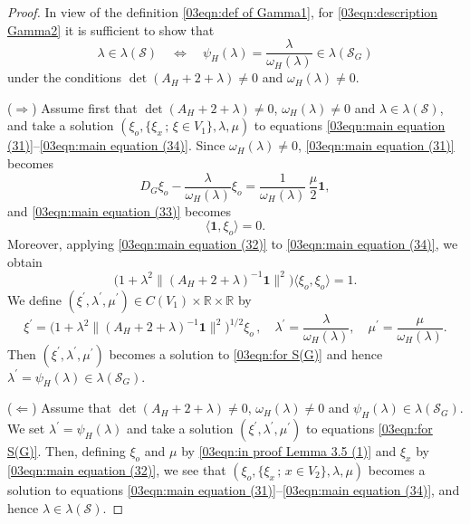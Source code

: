 \documentclass[12pt,a4paper]{article}
\newcommand{\1}{{\bm 1}}
\numberwithin{equation}{section}
\begin{document}
\begin{proof}
In view of the definition \eqref{03eqn:def of Gamma1},
for \eqref{03eqn:description Gamma2} it is sufficient to show that
\[
\lambda\in \lambda(\mathcal{S})
\quad\Leftrightarrow\quad
\psi_H(\lambda)
=\frac{\lambda}{\omega_H(\lambda)}\in \lambda(\mathcal{S}_G)
\]
under the conditions
$\det(A_H+2+\lambda)\neq0$ and $\omega_H(\lambda)\neq0$.

($\Rightarrow$) Assume first that 
$\det(A_H+2+\lambda)\neq0$, $\omega_H(\lambda)\neq0$
and $\lambda\in \lambda(\mathcal{S})$,
and take a solution $(\xi_o,\{\xi_x\,;\,\xi\in V_1\},\lambda,\mu)$
to equations
\eqref{03eqn:main equation (31)}--\eqref{03eqn:main equation (34)}.
Since $\omega_H(\lambda)\neq 0$,
\eqref{03eqn:main equation (31)} becomes
%
\begin{equation}\label{03eqn:main equation (51)}
D_G\xi_o-\frac{\lambda}{\omega_H(\lambda)} \xi_o
=\frac{1}{\omega_H(\lambda)}\,\frac{\mu}{2}\mathbf{1},
\end{equation}
and \eqref{03eqn:main equation (33)} becomes
%
\begin{equation}\label{03eqn:basic equation (53)}
\langle \mathbf{1},\xi_o \rangle=0.
\end{equation}
%
Moreover, applying \eqref{03eqn:main equation (32)}
to \eqref{03eqn:main equation (34)}, we obtain
%
\begin{equation}\label{03eqn:basic equation (54)(1)}
\big(1+\lambda^2\|(A_H+2+\lambda)^{-1}\mathbf{1}\|^2\big)
\langle \xi_o, \xi_o\rangle=1.
\end{equation}
%
We define $(\xi^\prime,\lambda^\prime,\mu^\prime)\in
C(V_1)\times \mathbb{R}\times\mathbb{R}$ by
\begin{equation}\label{03eqn:in proof Lemma 3.5 (1)}
\xi^\prime
=\big(1+\lambda^2\|(A_H+2+\lambda)^{-1}\mathbf{1}\|^2\big)^{1/2}
\xi_o\,,
\quad
\lambda^\prime=\frac{\lambda}{\omega_H(\lambda)},
\quad
\mu^\prime=\frac{\mu}{\omega_H(\lambda)}.
\end{equation}
Then $(\xi^\prime,\lambda^\prime,\mu^\prime)$ becomes 
a solution to \eqref{03eqn:for S(G)}
and hence $\lambda^\prime=\psi_H(\lambda)\in \lambda(\mathcal{S}_G)$.

($\Leftarrow$) Assume that 
$\det(A_H+2+\lambda)\neq0$, $\omega_H(\lambda)\neq0$ 
and $\psi_H(\lambda)\in \lambda(\mathcal{S}_G)$.
We set $\lambda^\prime=\psi_H(\lambda)$ and
take a solution $(\xi^\prime,\lambda^\prime,\mu^\prime)$ to
equations \eqref{03eqn:for S(G)}.
Then, defining $\xi_o$ and $\mu$ by 
\eqref{03eqn:in proof Lemma 3.5 (1)}
and $\xi_x$ by \eqref{03eqn:main equation (32)},
we see that $(\xi_o,\{\xi_x\,;\, x\in V_2\}, \lambda,\mu)$ becomes a
solution to equations 
\eqref{03eqn:main equation (31)}--\eqref{03eqn:main equation (34)},
and hence $\lambda\in \lambda(\mathcal{S})$.
\end{proof}
\end{document}
